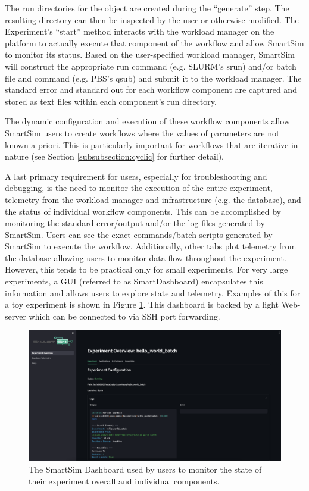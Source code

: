 \documentclass[utf8]{FrontiersinVancouver} %
\begin{document}
The run directories for the object are created during the ``generate'' step. The resulting directory can then be inspected by the user or otherwise modified. The Experiment's ``start'' method interacts with the workload manager on the platform to actually execute that component of the workflow and allow SmartSim to monitor its status. Based on the user-specified workload manager, SmartSim will construct the appropriate run command (e.g. SLURM's srun) and/or batch file and command (e.g. PBS's qsub) and submit it to the workload manager. The standard error and standard out for each workflow component are captured and stored as text files within each component's run directory.

The dynamic configuration and execution of these workflow components allow SmartSim users to create workflows where the values of parameters are not known a priori. This is particularly important for workflows that are iterative in nature (see Section \ref{subsubsection:cyclic} for further detail).

A last primary requirement for users, especially for troubleshooting and debugging, is the need to monitor the execution of the entire experiment, telemetry from the workload manager and infrastructure (e.g. the database), and the status of individual workflow components. This can be accomplished by monitoring the standard error/output and/or the log files generated by SmartSim. Users can see the exact commands/batch scripts generated by SmartSim to execute the workflow. Additionally, other tabs plot telemetry from the database allowing users to monitor data flow throughout the experiment. However, this tends to be practical only for small experiments. For very large experiments, a GUI (referred to as SmartDashboard) encapsulates this information and allows users to explore state and telemetry. Examples of this for a toy experiment is shown in Figure \ref{fig:smartsim-dashboard}. This dashboard is backed by a light Web-server which can be connected to via SSH port forwarding. 

\begin{figure}[htb]\label{figure:smartdashboard}
    \centering\includegraphics[width=0.8\columnwidth]{images/smartdashboard_experiment.png}
    \caption{The SmartSim Dashboard used by users to monitor the state of their experiment overall and individual components.}
    \label{fig:smartsim-dashboard}
\end{figure}
\end{document}
